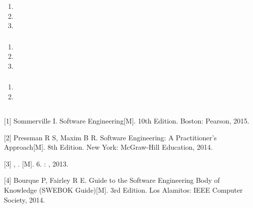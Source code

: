 \begin{enumerate}
\def\labelenumi{\arabic{enumi}.}
\tightlist
\item
\item
\item
\end{enumerate}

\hypertarget{section-23}{%
\subsubsection{}\label{section-23}}

\begin{enumerate}
\def\labelenumi{\arabic{enumi}.}
\tightlist
\item
\item
\item
\end{enumerate}

\hypertarget{section-24}{%
\subsubsection{}\label{section-24}}

\begin{enumerate}
\def\labelenumi{\arabic{enumi}.}
\tightlist
\item
\item
\end{enumerate}

\hypertarget{section-25}{%
\subsection{}\label{section-25}}

\hypertarget{section-26}{%
\subsection{}\label{section-26}}

{[}1{]} Sommerville I. Software Engineering{[}M{]}. 10th Edition.
Boston: Pearson, 2015.

{[}2{]} Pressman R S, Maxim B R. Software Engineering: A Practitioner's
Approach{[}M{]}. 8th Edition. New York: McGraw-Hill Education, 2014.

{[}3{]} , . {[}M{]}. 6. : , 2013.

{[}4{]} Bourque P, Fairley R E. Guide to the Software Engineering Body
of Knowledge (SWEBOK Guide){[}M{]}. 3rd Edition. Los Alamitos: IEEE
Computer Society, 2014.

